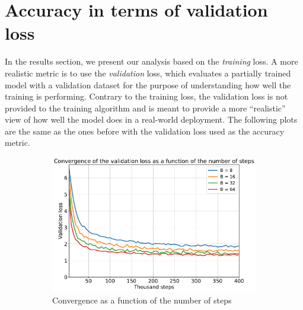 \documentclass{article}
\begin{document}
    \section{Accuracy in terms of validation loss}
    {
        In the results section, we present our analysis based on the \textit{training} loss. A more realistic metric is to use the \textit{validation} loss, which evaluates a partially trained model with a validation dataset for the purpose of understanding how well the training is performing. Contrary to the training loss, the validation loss is not provided to the training algorithm and is meant to provide a more ``realistic'' view of how well the model does in a real-world deployment. The following plots are the same as the ones before with the validation loss used as the accuracy metric.

        \begin{figure}[!h]
            \centering
            \begin{subfigure}[b]{0.47 \textwidth}
                \includegraphics[trim = {0.0in 0.0in 0.0in 0.0in}, clip, width = 1.0 \textwidth]{../Figures/convergence_history_validation.pdf}
                \caption{Convergence as a function of the number of steps}
                \label{fig:convergence_accuracy_validation}
            \end{subfigure}
            ~
            \begin{subfigure}[b]{0.47 \textwidth}

\end{subfigure}
\end{figure}}
\end{document}
